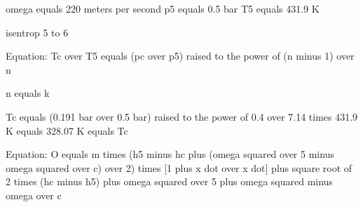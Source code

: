 omega equals 220 meters per second
p5 equals 0.5 bar
T5 equals 431.9 K

isentrop 5 to 6

Equation:
Tc over T5 equals (pc over p5) raised to the power of (n minus 1) over n

n equals k

Tc equals (0.191 bar over 0.5 bar) raised to the power of 0.4 over 7.14 times 431.9 K equals 328.07 K equals Tc

Equation:
O equals m times (h5 minus hc plus (omega squared over 5 minus omega squared over c) over 2) times [1 plus x dot over x dot] plus square root of 2 times (hc minus h5) plus omega squared over 5 plus omega squared minus omega over c